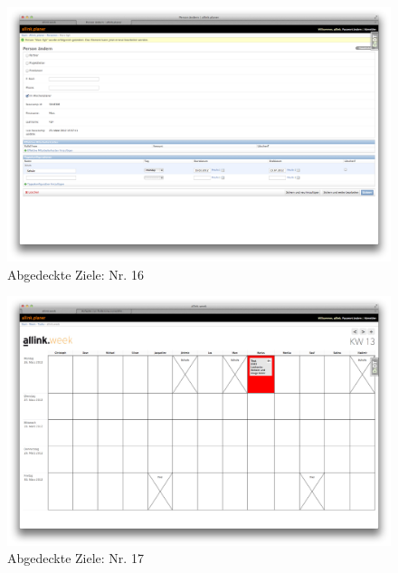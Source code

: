 \begin{figure}[htbp]
    \centering
        \includegraphics[height=0.85\textwidth,angle=90]{bilder/testing/Sperrtag_start_end.png}
    \caption{Abgedeckte Ziele: Nr. 16}
    \label{fig:bilder_testing_Sperrtag_start_end}
\end{figure}
\begin{figure}[htbp]
    \centering
        \includegraphics[height=0.85\textwidth,angle=90]{bilder/testing/warnmeldung.png}
    \caption{Abgedeckte Ziele: Nr. 17}
    \label{fig:bilder_testing_warnmeldung}
\end{figure}
